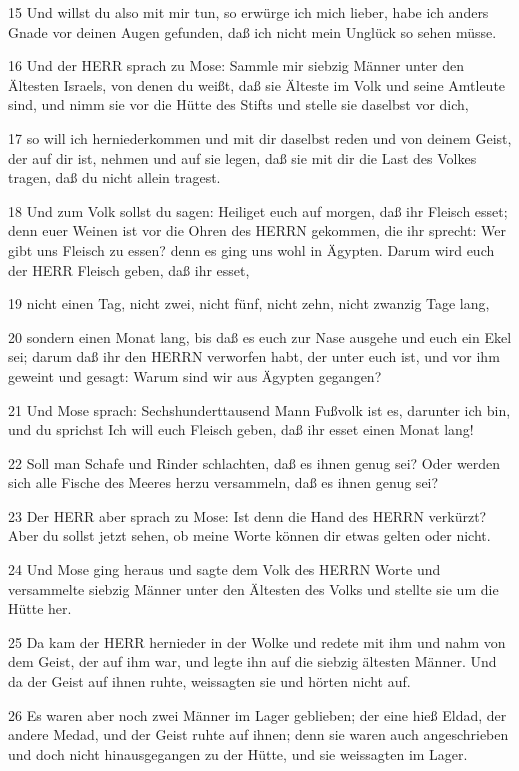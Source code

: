 \par 15 Und willst du also mit mir tun, so erwürge ich mich lieber, habe ich anders Gnade vor deinen Augen gefunden, daß ich nicht mein Unglück so sehen müsse.
\par 16 Und der HERR sprach zu Mose: Sammle mir siebzig Männer unter den Ältesten Israels, von denen du weißt, daß sie Älteste im Volk und seine Amtleute sind, und nimm sie vor die Hütte des Stifts und stelle sie daselbst vor dich,
\par 17 so will ich herniederkommen und mit dir daselbst reden und von deinem Geist, der auf dir ist, nehmen und auf sie legen, daß sie mit dir die Last des Volkes tragen, daß du nicht allein tragest.
\par 18 Und zum Volk sollst du sagen: Heiliget euch auf morgen, daß ihr Fleisch esset; denn euer Weinen ist vor die Ohren des HERRN gekommen, die ihr sprecht: Wer gibt uns Fleisch zu essen? denn es ging uns wohl in Ägypten. Darum wird euch der HERR Fleisch geben, daß ihr esset,
\par 19 nicht einen Tag, nicht zwei, nicht fünf, nicht zehn, nicht zwanzig Tage lang,
\par 20 sondern einen Monat lang, bis daß es euch zur Nase ausgehe und euch ein Ekel sei; darum daß ihr den HERRN verworfen habt, der unter euch ist, und vor ihm geweint und gesagt: Warum sind wir aus Ägypten gegangen?
\par 21 Und Mose sprach: Sechshunderttausend Mann Fußvolk ist es, darunter ich bin, und du sprichst Ich will euch Fleisch geben, daß ihr esset einen Monat lang!
\par 22 Soll man Schafe und Rinder schlachten, daß es ihnen genug sei? Oder werden sich alle Fische des Meeres herzu versammeln, daß es ihnen genug sei?
\par 23 Der HERR aber sprach zu Mose: Ist denn die Hand des HERRN verkürzt? Aber du sollst jetzt sehen, ob meine Worte können dir etwas gelten oder nicht.
\par 24 Und Mose ging heraus und sagte dem Volk des HERRN Worte und versammelte siebzig Männer unter den Ältesten des Volks und stellte sie um die Hütte her.
\par 25 Da kam der HERR hernieder in der Wolke und redete mit ihm und nahm von dem Geist, der auf ihm war, und legte ihn auf die siebzig ältesten Männer. Und da der Geist auf ihnen ruhte, weissagten sie und hörten nicht auf.
\par 26 Es waren aber noch zwei Männer im Lager geblieben; der eine hieß Eldad, der andere Medad, und der Geist ruhte auf ihnen; denn sie waren auch angeschrieben und doch nicht hinausgegangen zu der Hütte, und sie weissagten im Lager.

